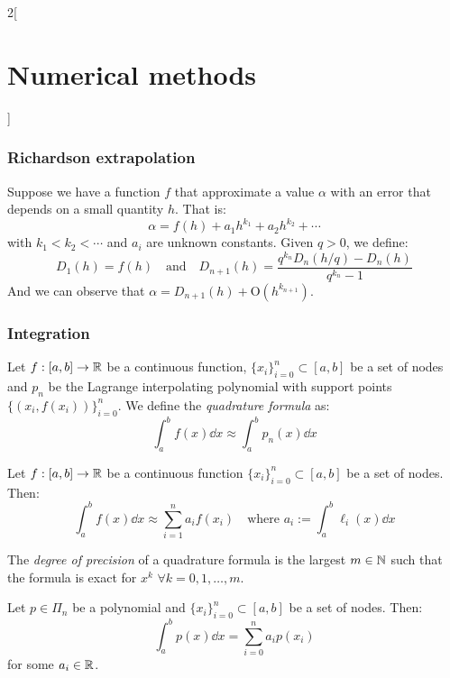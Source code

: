 \documentclass[../../../main.tex]{subfiles}
\begin{document}
\begin{multicols}{2}[\section{Numerical methods}]
  \subsubsection{Richardson extrapolation}
  \begin{theorem}
    Suppose we have a function $f$ that approximate a value $\alpha$ with an error that depends on a small quantity $h$. That is: $$\alpha=f(h)+a_1h^{k_1}+a_2h^{k_2}+\cdots$$ with $k_1<k_2<\cdots$ and $a_i$ are unknown constants. Given $q>0$, we define: $$D_1(h)=f(h)\quad\text{and}\quad D_{n+1}(h)=\frac{q^{k_n}D_n\left(h/q\right)-D_n(h)}{q^{k_n}-1}$$ And we can observe that $\alpha=D_{n+1}(h)+\text{O}(h^{k_{n+1}})$.
  \end{theorem}
  \subsubsection{Integration}
  \begin{definition}
    Let $f:[a,b]\rightarrow\mathbb{R}$ be a continuous function, $\{x_i\}_{i=0}^n\subset[a,b]$ be a set of nodes and $p_n$ be the Lagrange interpolating polynomial with support points $\{(x_i,f(x_i))\}_{i=0}^n$. We define the \emph{quadrature formula} as: $$\int_a^bf(x)\dd{x}\approx\int_a^bp_n(x)\dd{x}$$
  \end{definition}
  \begin{lemma}
    Let $f:[a,b]\rightarrow\mathbb{R}$ be a continuous function $\{x_i\}_{i=0}^n\subset[a,b]$ be a set of nodes. Then: $$\int_a^bf(x)\dd{x}\approx\sum_{i=1}^na_if(x_i)\quad\text{where }a_i:=\int_a^b\ell_i(x)\dd{x}$$
  \end{lemma}
  \begin{definition}
    The \emph{degree of precision} of a quadrature formula is the largest $m\in\mathbb{N}$ such that the formula is exact for $x^k$ $\forall k=0,1,\ldots,m$.
  \end{definition}
  \begin{lemma}
    Let $p\in\Pi_n$ be a polynomial and $\{x_i\}_{i=0}^n\subset[a,b]$ be a set of nodes. Then: $$\int_a^bp(x)\dd{x}=\sum_{i=0}^na_ip(x_i)$$ for some $a_i\in\mathbb{R}$.
  \end{lemma}

\end{multicols}
\end{document}
